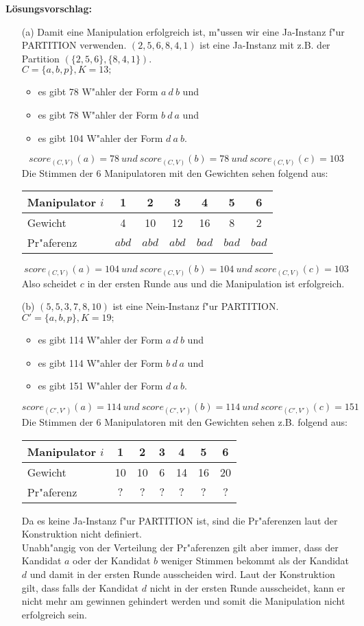 \documentclass[a4paper,12pt,titlepage,oneside]{article}
\newcommand\bc{\begin{center}}
\newcommand\ec{\end{center}}
\begin{document}
\noindent\textbf{L\"osungsvorschlag:}
\begin{enumerate}
\item[(a)]Damit eine Manipulation erfolgreich ist, m"ussen wir eine Ja-Instanz f"ur PARTITION verwenden. $(2,5,6,8,4,1)$ ist eine Ja-Instanz mit z.B. der Partition $(\{2,5,6\},\{8,4,1\})$.\\
$C=\{a,b,p\}, K=13;$
\begin{itemize}
\item es gibt 78 W"ahler der Form $a\ d\ b$ und\\
\item es gibt 78 W"ahler der Form $b\ d\ a$ und\\
\item es gibt 104 W"ahler der Form $d\ a\ b$.
\end{itemize}
$$score_{(C,V)}(a)=78 \ und \ score_{(C,V)}(b)=78 \ und\  score_{(C,V)}(c)=103$$
Die Stimmen der 6 Manipulatoren mit den Gewichten sehen folgend aus:\\
\bc
\begin{tabular}{|l|c|c|c|c|c|c|}
\hline
Manipulator $i$& 1&2&3&4&5&6\\
\hline
Gewicht&4&10&12&16&8&2\\
\hline
Pr"aferenz& $abd$&$abd$&$abd$&$bad$&$bad$&$bad$\\
\hline
\end{tabular}
\ec
$$score_{(C,V)}(a)=104 \ und \ score_{(C,V)}(b)=104 \ und\  score_{(C,V)}(c)=103$$
Also scheidet $c$ in der ersten Runde aus und die Manipulation ist erfolgreich.
\item[(b)] $(5,5,3,7,8,10)$ ist eine Nein-Instanz f"ur PARTITION.\\
 $C'=\{a,b,p\}, K=19;$
\begin{itemize}
\item es gibt 114 W"ahler der Form $a\ d\ b$ und\\
\item es gibt 114 W"ahler der Form $b\ d\ a$ und\\
\item es gibt 151 W"ahler der Form $d\ a\ b$.
\end{itemize}
$$score_{(C',V')}(a)=114 \ und \ score_{(C',V')}(b)=114 \ und\  score_{(C',V')}(c)=151$$
Die Stimmen der 6 Manipulatoren mit den Gewichten sehen z.B. folgend aus:\\
\bc
\begin{tabular}{|l|c|c|c|c|c|c|}
\hline
Manipulator $i$& 1&2&3&4&5&6\\
\hline
Gewicht&10&10&6&14&16&20\\
\hline
Pr"aferenz& $?$&$?$&$?$&$?$&$?$&$?$\\
\hline
\end{tabular}
\ec
Da es keine Ja-Instanz f"ur PARTITION ist, sind die Pr"aferenzen laut der Konstruktion nicht definiert.\\
Unabh"angig von der Verteilung der Pr"aferenzen gilt aber immer, dass der Kandidat $a$ oder der Kandidat $b$ weniger Stimmen bekommt als der Kandidat $d$ und damit in der ersten Runde ausscheiden wird. Laut der Konstruktion gilt, dass falls der Kandidat $d$ nicht in der ersten Runde ausscheidet, kann er nicht mehr am gewinnen gehindert werden und somit die Manipulation nicht erfolgreich sein.
\end{enumerate}
\end{document}

